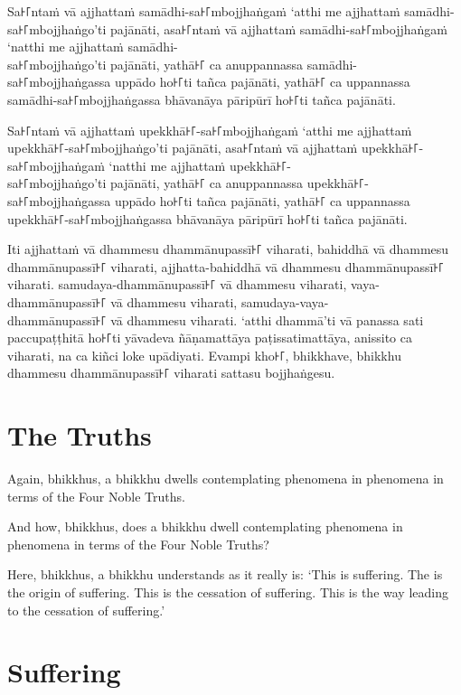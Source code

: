 Sa꜔꜒ntaṁ vā ajjhattaṁ samādhi-sa꜔꜒mbojjhaṅgaṁ ‘atthi me ajjhattaṁ samādhi-sa꜔꜒mbojjhaṅgo’ti pajānāti,
asa꜔꜒ntaṁ vā ajjhattaṁ samādhi-sa꜔꜒mbojjhaṅgaṁ ‘natthi me ajjhattaṁ samādhi-\\ sa꜔꜒mbojjhaṅgo’ti pajānāti,
yathā꜔꜒ ca anuppannassa samādhi-\\ sa꜔꜒mbojjhaṅgassa uppādo ho꜔꜒ti tañca pajānāti,
yathā꜔꜒ ca uppannassa samādhi-sa꜔꜒mbojjhaṅgassa bhāvanāya pāripūrī ho꜔꜒ti tañca pajānāti.

Sa꜔꜒ntaṁ vā ajjhattaṁ upekkhā꜔꜒-sa꜔꜒mbojjhaṅgaṁ ‘atthi me ajjhattaṁ upekkhā꜔꜒-sa꜔꜒mbojjhaṅgo’ti pajānāti,
asa꜔꜒ntaṁ vā ajjhattaṁ upekkhā꜔꜒-sa꜔꜒mbojjhaṅgaṁ ‘natthi me ajjhattaṁ upekkhā꜔꜒-\\ sa꜔꜒mbojjhaṅgo’ti pajānāti,
yathā꜔꜒ ca anuppannassa upekkhā꜔꜒-\\ sa꜔꜒mbojjhaṅgassa uppādo ho꜔꜒ti tañca pajānāti,
yathā꜔꜒ ca uppannassa upekkhā꜔꜒-sa꜔꜒mbojjhaṅgassa bhāvanāya pāripūrī ho꜔꜒ti tañca pajānāti.

Iti ajjhattaṁ vā dhammesu dhammānupassī꜔꜒ viharati,
bahiddhā vā dhammesu dhammānupassī꜔꜒ viharati,
ajjhatta-bahiddhā vā dhammesu dhammānupassī꜔꜒ viharati.
samudaya-dhammānupassī꜔꜒ vā dhammesu viharati,
vaya-dhammānupassī꜔꜒ vā dhammesu viharati,
samudaya-vaya-\\ dhammānupassī꜔꜒ vā dhammesu viharati.
‘atthi dhammā’ti vā panassa sati paccupaṭṭhitā ho꜔꜒ti
yāvadeva ñāṇamattāya paṭissatimattāya, anissito ca viharati,
na ca kiñci loke upādiyati. Evampi kho꜔꜒, bhikkhave, bhikkhu
dhammesu dhammānupassī꜔꜒ viharati sattasu bojjhaṅgesu.

\enlargethispage{\baselineskip}


\englishPage
\section*{The Truths}%

Again, bhikkhus, a bhikkhu dwells contemplating phenomena in phenomena in terms
of the Four Noble Truths.

And how, bhikkhus, does a bhikkhu dwell contemplating phenomena in phenomena in
terms of the Four Noble Truths?

Here, bhikkhus, a bhikkhu understands as it really is: `This is suffering. The
is the origin of suffering. This is the cessation of suffering. This is the way
leading to the cessation of suffering.'

\section{Suffering}

